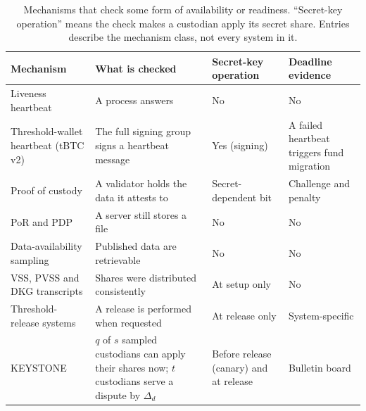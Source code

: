 \documentclass[11pt]{article}
\begin{document}
\begin{table}[ht]
\caption{Mechanisms that check some form of availability or readiness. ``Secret-key operation'' means the check makes a custodian apply its secret share. Entries describe the mechanism class, not every system in it.}
\label{tab:s-related}
\centering
\footnotesize
\begin{tabularx}{\textwidth}{@{}>{\raggedright\arraybackslash}p{}>{\raggedright\arraybackslash}X>{\raggedright\arraybackslash}p{}>{\raggedright\arraybackslash}p{}@{}}
\toprule
Mechanism & What is checked & Secret-key operation & Deadline evidence\\
\midrule
Liveness heartbeat & A process answers & No & No\\
Threshold-wallet heartbeat (tBTC v2)\cite{tbtc2026heartbeat} & The full signing group signs a heartbeat message & Yes (signing) & A failed heartbeat triggers fund migration\\
Proof of custody\cite{feist2021custody} & A validator holds the data it attests to & Secret-dependent bit & Challenge and penalty\\
PoR and PDP\cite{juels2007por,ateniese2007pdp,bowers2009hail} & A server still stores a file & No & No\\
Data-availability sampling\cite{albassam2021fraud,hallandersen2025das} & Published data are retrievable & No & No\\
VSS, PVSS and DKG transcripts\cite{feldman1987vss,schoenmakers1999pvss,gennaro2007dkg} & Shares were distributed consistently & At setup only & No\\
Threshold-release systems\cite{kokoriskogias2020calypso,stengele2021ethtid,bebel2022ferveo} & A release is performed when requested & At release only & System-specific\\
KEYSTONE & $q$ of $s$ sampled custodians can apply their shares now; $t$ custodians serve a dispute by $\Delta_d$ & Before release (canary) and at release & Bulletin board\\
\bottomrule
\end{tabularx}
\end{table}

\begin{table}[ht]
\caption{Readiness checks compared (R1 prototype). Costs are R1 medians for ffdhe2048; bytes are canonical request plus response transcripts.}
\label{tab:s-baselines}
\centering
\footnotesize
{\renewcommand{\ref}[1]{2}}
\end{table}



\end{document}
